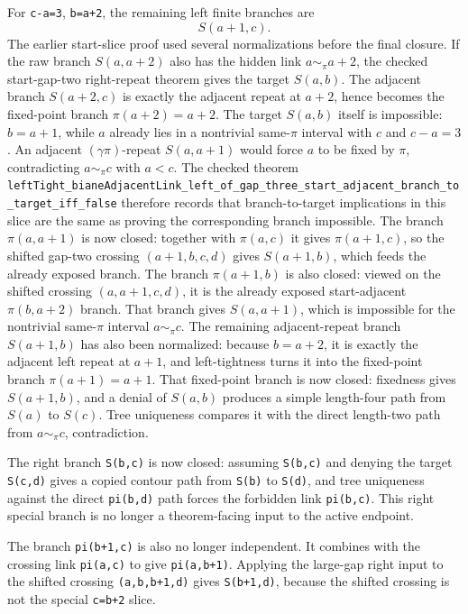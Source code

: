 \documentclass[
]{article}
\begin{document}
For \texttt{c-a=3}, \texttt{b=a+2}, the remaining left finite branches
are \[
  S(a+1,c).
\] The earlier start-slice proof used several normalizations before the
final closure. If the raw branch \(S(a,a+2)\) also has the hidden link
\(a\sim_\pi a+2\), the checked start-gap-two right-repeat theorem gives
the target \(S(a,b)\). The adjacent branch \(S(a+2,c)\) is exactly the
adjacent repeat at \(a+2\), hence becomes the fixed-point branch
\(\pi(a+2)=a+2\). The target \(S(a,b)\) itself is impossible: \(b=a+1\),
while \(a\) already lies in a nontrivial same-\(\pi\) interval with
\(c\) and \(c-a=3\). An adjacent \((\gamma\pi)\)-repeat \(S(a,a+1)\)
would force \(a\) to be fixed by \(\pi\), contradicting \(a\sim_\pi c\)
with \(a<c\). The checked theorem
\texttt{leftTight\_bianeAdjacentLink\_left\_of\_gap\_three\_start\_adjacent\_branch\_to\_target\_iff\_false}
therefore records that branch-to-target implications in this slice are
the same as proving the corresponding branch impossible. The branch
\(\pi(a,a+1)\) is now closed: together with \(\pi(a,c)\) it gives
\(\pi(a+1,c)\), so the shifted gap-two crossing \((a+1,b,c,d)\) gives
\(S(a+1,b)\), which feeds the already exposed branch. The branch
\(\pi(a+1,b)\) is also closed: viewed on the shifted crossing
\((a,a+1,c,d)\), it is the already exposed start-adjacent \(\pi(b,a+2)\)
branch. That branch gives \(S(a,a+1)\), which is impossible for the
nontrivial same-\(\pi\) interval \(a\sim_\pi c\). The remaining
adjacent-repeat branch \(S(a+1,b)\) has also been normalized: because
\(b=a+2\), it is exactly the adjacent left repeat at \(a+1\), and
left-tightness turns it into the fixed-point branch \(\pi(a+1)=a+1\).
That fixed-point branch is now closed: fixedness gives \(S(a+1,b)\), and
a denial of \(S(a,b)\) produces a simple length-four path from \(S(a)\)
to \(S(c)\). Tree uniqueness compares it with the direct length-two path
from \(a\sim_\pi c\), contradiction.

The right branch \texttt{S(b,c)} is now closed: assuming \texttt{S(b,c)}
and denying the target \texttt{S(c,d)} gives a copied contour path from
\texttt{S(b)} to \texttt{S(d)}, and tree uniqueness against the direct
\texttt{pi(b,d)} path forces the forbidden link \texttt{pi(b,c)}. This
right special branch is no longer a theorem-facing input to the active
endpoint.

The branch \texttt{pi(b+1,c)} is also no longer independent. It combines
with the crossing link \texttt{pi(a,c)} to give \texttt{pi(a,b+1)}.
Applying the large-gap right input to the shifted crossing
\texttt{(a,b,b+1,d)} gives \texttt{S(b+1,d)}, because the shifted
crossing is not the special \texttt{c=b+2} slice.
\end{document}
